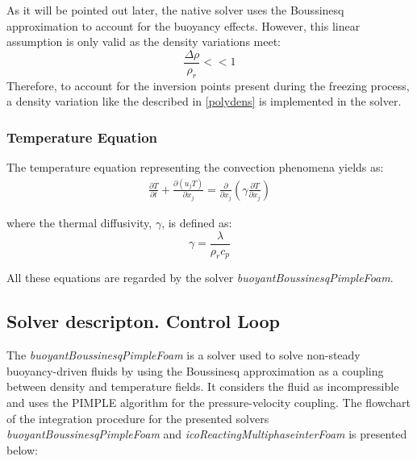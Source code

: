 As it will be pointed out later, the native solver uses the Boussinesq approximation to account for the buoyancy effects. However, this linear assumption is only valid as the density variations meet:
\begin{equation}
\frac{\Delta \rho}{\rho_{r}}<<1
\label{3.10}
\end{equation}
Therefore, to account for the inversion points present during the freezing process, a density variation like the described in \ref{polydens} is implemented in the solver.

\subsubsection{Temperature Equation}
The temperature equation representing the convection phenomena yields as:
\begin{equation}
	\begin{aligned}
	\frac{\partial T}{\partial t}+ \frac{\partial (u_{j} T)}{\partial x_{j}}=\frac{\partial}{\partial x_{j}}\left(\gamma \frac{\partial T}{\partial x_{j}}\right)
	\end{aligned}
	\label{3.11}
\end{equation}

where the thermal diffusivity, $\gamma$, is defined as:
\begin{equation}
	\gamma=\frac{\lambda}{\rho_{r} c_{p}}
	\label{3.12}
\end{equation}

All these equations are regarded by the solver \textit{buoyantBoussinesqPimpleFoam}.
\subsection{Solver descripton. Control Loop}
The \textit{buoyantBoussinesqPimpleFoam} is a solver used to solve non-steady buoyancy-driven fluids by using the Boussinesq approximation as a coupling between density and temperature fields. It considers the fluid as incompressible and uses the PIMPLE algorithm for the pressure-velocity coupling. The flowchart of the integration procedure for the presented solvers \textit{buoyantBoussinesqPimpleFoam} and \textit{icoReactingMultiphaseinterFoam} is presented below:

